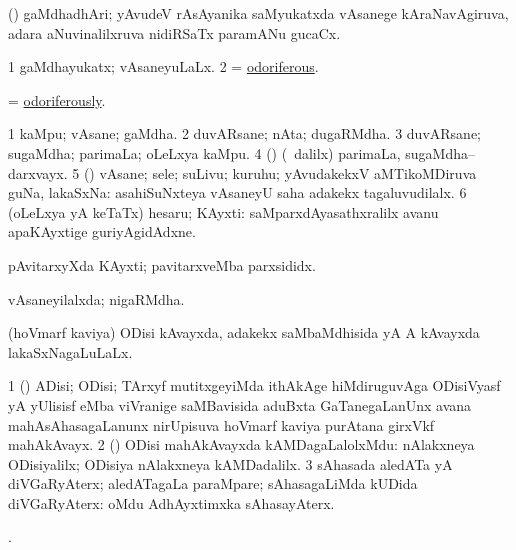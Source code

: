 \bentry
{}
\gl{\nA}
\bmng
(\ravi) gaMdhadhAri; yAvudeV rAsAyanika saMyukatxda vAsanege kAraNavAgiruva, adara aNuvinalilxruva nidiRSaTx paramANu gucaCx. 
\emng
\eentry

\bentry
{}
\gl{\gu}
\bmng
\bnum
\num{1} gaMdhayukatx; vAsaneyuLaLx. 
\num{2} = \hyperlink{odoriferous}{odoriferous}. 
\enum
\emng
\eentry

\bentry
{}
\gl{\kirxvi}
\bmng
= \hyperlink{odoriferously}{odoriferously}. 
\emng
\eentry

\bentry
{}
\gl{\nA}
\bmng
\bnum
\num{1} kaMpu; vAsane; gaMdha. 
\num{2} duvARsane; nAta; dugaRMdha. 
\num{3} duvARsane; sugaMdha; parimaLa; oLeLxya kaMpu. 
\num{4} (\pArxparx) (\sA\ \bava dalilx) parimaLa, sugaMdha--darxvayx. 
\num{5} (\rUpa) vAsane; sele; suLivu; kuruhu; yAvudakekxV aMTikoMDiruva guNa, lakaSxNa:  asahiSuNxteya vAsaneyU saha adakekx tagaluvudilalx. 
\num{6} (oLeLxya yA keTaTx) hesaru; KAyxti:  saMparxdAyasathxralilx avanu apaKAyxtige guriyAgidAdxne. 
\enum
\emng

\noindent
\gl{\pagu}
\bmng
{} pAvitarxyXda KAyxti; pavitarxveMba parxsididx. 
\emng
\eentry

\bentry
{}
\gl{\gu}
\bmng
vAsaneyilalxda; nigaRMdha. 
\emng
\eentry

\bentry
{}
\gl{\gu}
\bmng
(hoVmarf kaviya) ODisi kAvayxda, adakekx saMbaMdhisida yA A kAvayxda lakaSxNagaLuLaLx. 
\emng
\eentry

\bentry
{}
\gl{\nA}
\bmng
\bnum
\num{1} () ADisi; ODisi; TArxyf mutitxgeyiMda ithAkAge hiMdiruguvAga ODisiVyasf yA yUlisisf eMba viVranige saMBavisida aduBxta GaTanegaLanUnx avana mahAsAhasagaLanunx nirUpisuva hoVmarf kaviya purAtana girxVkf mahAkAvayx. 
\num{2} () ODisi mahAkAvayxda  kAMDagaLalolxMdu:  nAlakxneya ODisiyalilx; ODisiya nAlakxneya kAMDadalilx. 
\num{3} sAhasada aledATa yA diVGaRyAterx; aledATagaLa paraMpare; sAhasagaLiMda kUDida diVGaRyAterx:  oMdu AdhAyxtimxka sAhasayAterx. 
\enum
\emng
\eentry

\bentry
{}
\gl{\saMkiSx}
\bmng
{}. 
\emng
\eentry

